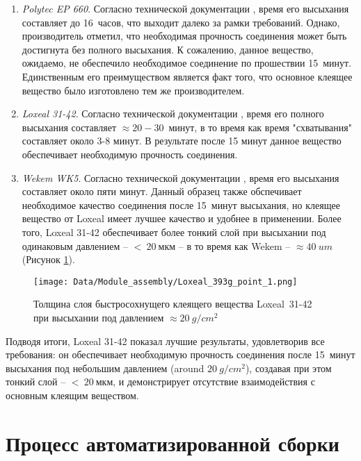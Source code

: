 \begin{enumerate}
\setlength\itemsep{-0.5em}
\item \textit{Polytec EP 660}. Согласно технической документации \cite{Polytec_EP_660_datasheet}, время его высыхания составляет до 16~часов, что выходит далеко за рамки требований. Однако, производитель отметил, что необходимая прочность соединения может быть достигнута без полного высыхания. К сожалению, данное вещество, ожидаемо, не обеспечило необходимое соединение по прошествии 15~минут. Единственным его преимуществом является факт того, что основное клеящее вещество было изготовлено тем же производителем.
\item \textit{Loxeal 31-42}. Согласно технической документации \cite{Polytec_EP_660_datasheet}, время его полного высыхания составляет $\approx20-30$~минут, в то время как время "схватывания" составляет около 3-8 минут. В результате после 15 минут данное вещество обеспечивает необходимую прочность соединения.
\item \textit{Wekem WK5}. Согласно технической документации \cite{Wekem_WK_5_datasheet}, время его высыхания составляет около пяти минут. Данный образец также обспечивает необходимое качество соединения после 15~минут высыхания, но клеящее вещество от Loxeal имеет лучшее качество и удобнее в применении. Более того, Loxeal 31-42 обеспечивает более тонкий слой при высыхании под одинаковым давлением -- $<~20~мкм$ -- в то время как Wekem --   $\approx40~um$ (Рисунок \ref{fig:glue_thickness}).
\end{enumerate}

\begin{figure}[ht]\centering
\texttt{[image: Data/Module\_assembly/Loxeal\_393g\_point\_1.png]}
\caption{Толщина слоя быстросохнущего клеящего вещества Loxeal~31-42 при высыхании под давлением $\approx20~g/cm^{2}$}
\label{fig:glue_thickness}
\end{figure}

Подводя итоги, Loxeal 31-42 показал лучшие результаты, удовлетворив все требования: он обеспечивает необходимую прочность соединения после 15~минут высыхания под небольшим давлением (around $20~g/cm^{2}$), создавая при этом тонкий слой -- $<~20~мкм$, и демонстрирует отсутствие взаимодействия с основным клеящим веществом.

\section{Процесс автоматизированной сборки}

